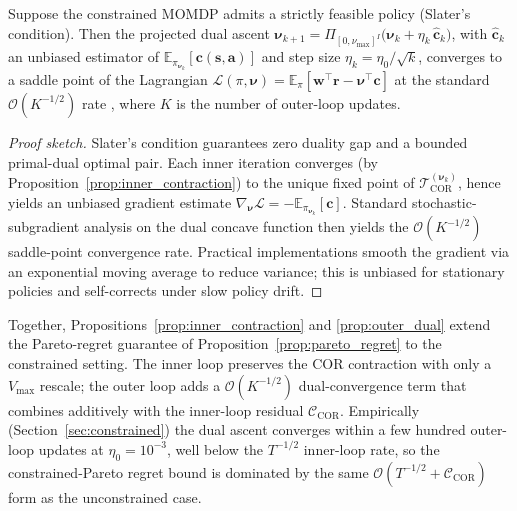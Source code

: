 \begin{proposition}
\label{prop:outer_dual}
Suppose the constrained MOMDP admits a strictly feasible policy (Slater's
condition). Then the projected dual ascent
$\bm{\nu}_{k+1}=\Pi_{[0,\nu_{\max}]^I}\bigl(\bm{\nu}_k+
\eta_k\,\hat{\mathbf{c}}_k\bigr)$, with $\hat{\mathbf{c}}_k$ an unbiased
estimator of $\mathbb{E}_{\pi_{\bm{\nu}_k}}[\mathbf{c}(\mathbf{s},
\mathbf{a})]$ and step size $\eta_k=\eta_0/\sqrt{k}$, converges to a
saddle point of the Lagrangian $\mathcal{L}(\pi,\bm{\nu})=
\mathbb{E}_\pi[\mathbf{w}^\top\mathbf{r}-\bm{\nu}^\top\mathbf{c}]$ at the
standard $\mathcal{O}(K^{-1/2})$ rate
\cite[Sec.~6.4]{bertsekas2019rl}, where $K$ is the number of outer-loop
updates.
\end{proposition}

\begin{proof}[Proof sketch]
Slater's condition guarantees zero duality gap and a bounded primal-dual
optimal pair. Each inner iteration converges (by
Proposition~\ref{prop:inner_contraction}) to the unique fixed point of
$\mathcal{T}_{\text{COR}}^{(\bm{\nu}_k)}$, hence yields an unbiased
gradient estimate
$\nabla_{\bm{\nu}}\mathcal{L} = -\mathbb{E}_{\pi_{\bm{\nu}_k}}[\mathbf{c}]$.
Standard stochastic-subgradient analysis on the dual concave function
\cite[Sec.~6.4]{bertsekas2019rl} then yields the $\mathcal{O}(K^{-1/2})$
saddle-point convergence rate. Practical implementations smooth the
gradient via an exponential moving average to reduce variance; this is
unbiased for stationary policies and self-corrects under slow policy
drift.
\end{proof}

\begin{remark}
Together, Propositions~\ref{prop:inner_contraction} and
\ref{prop:outer_dual} extend the Pareto-regret guarantee of
Proposition~\ref{prop:pareto_regret} to the constrained setting. The
inner loop preserves the COR contraction with only a $V_{\max}$ rescale;
the outer loop adds a $\mathcal{O}(K^{-1/2})$ dual-convergence term
that combines additively with the inner-loop residual
$\mathcal{C}_{\text{COR}}$. Empirically (Section~\ref{sec:constrained})
the dual ascent converges within a few hundred outer-loop updates at
$\eta_0=10^{-3}$, well below the $T^{-1/2}$ inner-loop rate, so the
constrained-Pareto regret bound is dominated by the same
$\mathcal{O}(T^{-1/2}+\mathcal{C}_{\text{COR}})$ form as the
unconstrained case.
\end{remark}

